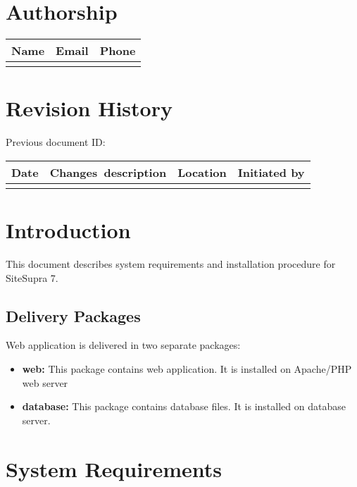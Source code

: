 \documentclass[12pt]{article}
\newcommand{\vigProjectName}{SiteSupra 7}
\begin{document}
\section*{Authorship}

\begin{tabularx}{\textwidth}{X X X}
 \textbf{Name} & \textbf{Email} & \textbf{Phone} \\
 \hline\noalign{\smallskip}
\end{tabularx}

\section*{Revision History}
Previous document ID:

\begin{tabularx}{\textwidth}{l X l l}
 \textbf{Date} & \textbf{\mbox{Changes description}} & \textbf{Location} & \textbf{Initiated by} \\
 \hline\noalign{\smallskip}
\end{tabularx}

\newpage

\section{Introduction}

This document describes system requirements and installation procedure for {\vigProjectName}.

\subsection{Delivery Packages}

Web application is delivered in two separate packages:
\begin{itemize}
	\item \textbf{web:} This package contains web application. It is installed on Apache/PHP web server
	\item \textbf{database:} This package contains database files. It is installed on database server.
\end{itemize}

\section{System Requirements}
\end{document}
